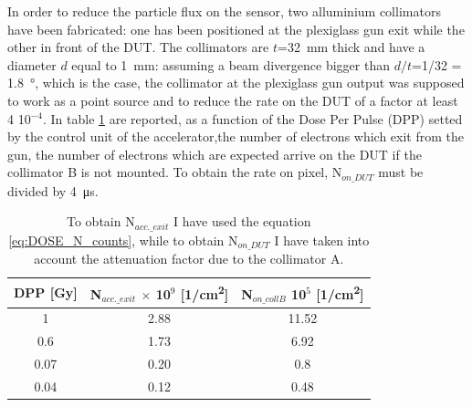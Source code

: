       In order to reduce the particle flux on the sensor, two alluminium collimators have been fabricated: one has been positioned at the plexiglass gun exit while the other in front of the DUT. The collimators are $t$=\SI{32}{mm} thick and have a diameter $d$ equal to \SI{1}{mm}: assuming a beam divergence bigger than $d/t$=1/32 = \SI{1.8}{\degree}, which is the case, the collimator at the plexiglass gun output was supposed to work as a point source and to reduce the rate on the DUT of a factor at least 4 10${^{-4}}$. In table \ref{tab:Dose_N} are reported, as a function of the Dose Per Pulse (DPP) setted by the control unit of the accelerator,the number of electrons which exit from the gun, the number of electrons which are expected arrive on the DUT if the collimator B is not mounted. 
      To obtain the rate on pixel, N$_{on\_DUT}$ must be divided by \SI{4}{\us}.

      \begin{table}
         \begin{center}
         \begin{tabular}{ c |c | c}
         DPP [\si{Gy}] & N$_{acc.\_exit}$ $\times$ 10$^{9}$ [\si{1/cm\squared}] & N$_{on\_collB}$ 10$^{5}$ [\si{1/cm\squared}]\\
         \hline
         1 & 2.88 & 11.52 \\ 
         0.6 & 1.73 & 6.92 \\
         0.07 & 0.20 & 0.8\\
         0.04 & 0.12 & 0.48\\
         \end{tabular}
         \caption{To obtain N$_{acc.\_exit}$ I have used the equation \ref{eq:DOSE_N_counts}, while to obtain N$_{on\_DUT}$ I have taken into account the attenuation factor due to the collimator A.}
         \label{tab:Dose_N}
         \end{center}
     \end{table}
      
      
      
